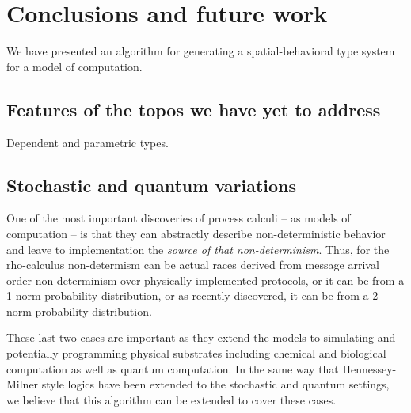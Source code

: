\section{Conclusions and future work}

We have presented an algorithm for generating a spatial-behavioral
type system for a model of computation.

\subsection{Features of the topos we have yet to address}
Dependent and parametric types.

\subsection{Stochastic and quantum variations}

One of the most important discoveries of process calculi -- as models
of computation -- is that they can abstractly describe
non-deterministic behavior and leave to implementation the
\emph{source of that non-determinism}. Thus, for the rho-calculus
non-determism can be actual races derived from message arrival order
non-determinism over physically implemented protocols, or it can be
from a 1-norm probability distribution, or as recently discovered, it
can be from a 2-norm probability distribution.

These last two cases are important as they extend the models to
simulating and potentially programming physical substrates including
chemical and biological computation as well as quantum computation. In
the same way that Hennessey-Milner style logics have been extended to
the stochastic and quantum settings, we believe that this algorithm
can be extended to cover these cases.



